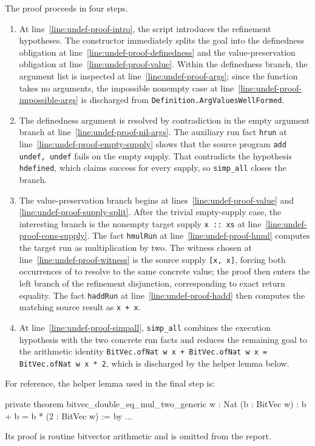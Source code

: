 The proof proceeds in four steps.
\begin{enumerate}
  \item At line~\ref{line:undef-proof-intro}, the script introduces the refinement
    hypotheses. The constructor immediately splits the goal into the
    definedness obligation at line~\ref{line:undef-proof-definedness} and the
    value-preservation obligation at line~\ref{line:undef-proof-value}. Within the
    definedness branch, the argument list is inspected at
    line~\ref{line:undef-proof-args}; since the function takes no arguments, the
    impossible nonempty case at line~\ref{line:undef-proof-impossible-args} is
    discharged from \texttt{Definition.ArgValuesWellFormed}.
  \item The definedness argument is resolved by contradiction in the empty
    argument branch at line~\ref{line:undef-proof-nil-args}. The auxiliary run fact
    \texttt{hrun} at line~\ref{line:undef-proof-empty-supply} shows that the source
    program \texttt{add undef, undef} fails on the empty supply. That
    contradicts the hypothesis \texttt{hdefined}, which claims success for
    every supply, so \texttt{simp\_all} closes the branch.
  \item The value-preservation branch begins at
    lines~\ref{line:undef-proof-value} and \ref{line:undef-proof-supply-split}. After the
    trivial empty-supply case, the interesting branch is the nonempty target
    supply \texttt{x :: xs} at line~\ref{line:undef-proof-cons-supply}. The fact
    \texttt{hmulRun} at line~\ref{line:undef-proof-hmul} computes the target run as
    multiplication by two. The witness chosen at
    line~\ref{line:undef-proof-witness} is the source supply \texttt{[x, x]},
    forcing both occurrences of \vundef to resolve to the same concrete value;
    the proof then enters the left branch of the refinement disjunction,
    corresponding to exact return equality.
    The fact \texttt{haddRun} at line~\ref{line:undef-proof-hadd} then computes the
    matching source result as \texttt{x + x}.
  \item At line~\ref{line:undef-proof-simpall}, \texttt{simp\_all} combines the
    execution hypothesis with the two concrete run facts and reduces the
    remaining goal to the arithmetic identity
    \texttt{BitVec.ofNat w x + BitVec.ofNat w x = BitVec.ofNat w x * 2}, which
    is discharged by the helper lemma below.
\end{enumerate}

For reference, the helper lemma used in the final step is:
\small
\begin{leanlisting}
private theorem bitvec_double_eq_mul_two_generic {w : Nat} (b : BitVec w) :
    b + b = b * (2 : BitVec w) := by
  ...
\end{leanlisting}
\normalsize
Its proof is routine bitvector arithmetic and is omitted from the report.

